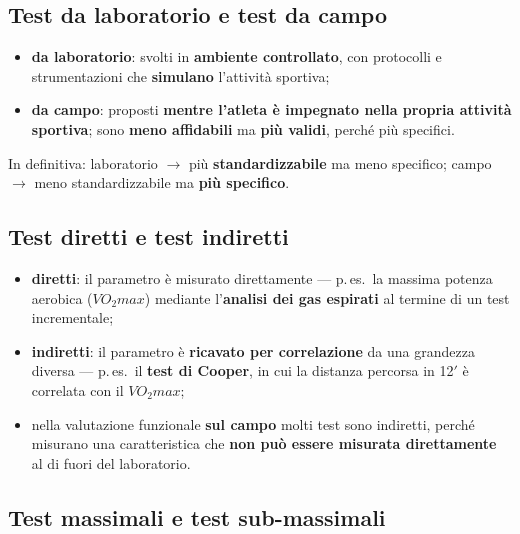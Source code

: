 \subsection{Test da laboratorio e test da campo}

\begin{itemize}
  \item \textbf{da laboratorio}: svolti in \textbf{ambiente controllato}, con protocolli e
    strumentazioni che \textbf{simulano} l'attività sportiva;
  \item \textbf{da campo}: proposti \textbf{mentre l'atleta è impegnato nella propria attività
    sportiva}; sono \textbf{meno affidabili} ma \textbf{più validi}, perché più specifici.
\end{itemize}

In definitiva: laboratorio $\rightarrow$ più \textbf{standardizzabile} ma meno specifico; campo
$\rightarrow$ meno standardizzabile ma \textbf{più specifico}.

\subsection{Test diretti e test indiretti}

\begin{itemize}
  \item \textbf{diretti}: il parametro è misurato direttamente --- p.\,es.\ la massima potenza
    aerobica ($VO_2max$) mediante l'\textbf{analisi dei gas espirati} al termine di un test
    incrementale;
  \item \textbf{indiretti}: il parametro è \textbf{ricavato per correlazione} da una grandezza
    diversa --- p.\,es.\ il \textbf{test di Cooper}, in cui la distanza percorsa in 12$'$ è
    correlata con il $VO_2max$;
  \item nella valutazione funzionale \textbf{sul campo} molti test sono indiretti, perché misurano
    una caratteristica che \textbf{non può essere misurata direttamente} al di fuori del laboratorio.
\end{itemize}

\subsection{Test massimali e test sub-massimali}

